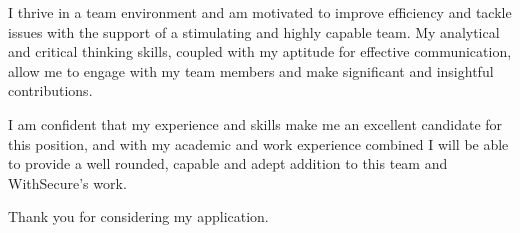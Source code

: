 \documentclass[11pt, a4paper]{awesome-cv} %
\begin{document}
\begin{cvletter}

I thrive in a team environment and am motivated to improve efficiency and tackle issues with the support of a stimulating and highly capable team. My analytical and critical thinking skills, coupled with my aptitude for effective communication, allow me to engage with my team members and make significant and insightful contributions.

I am confident that my experience and skills make me an excellent candidate for this position, and with my academic and work experience combined I will be able to provide a well rounded, capable and adept addition to this team and WithSecure's work. 

Thank you for considering my application.


\end{cvletter}


\makeletterclosing %
\end{document}
